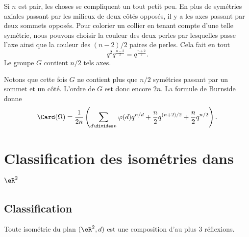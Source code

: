 Si \( n\) est pair, les choses se compliquent un tout petit peu. En plus de symétries axiales passant par les milieux de deux côtés opposés, il y a les axes passant par deux sommets opposés. Pour colorier un collier en tenant compte d'une telle symétrie, nous pouvons choisir la couleur des deux perles par lesquelles passe l'axe ainsi que la couleur des \( (n-2)/2\) paires de perles. Cela fait en tout
\begin{equation}
	q^2q^{\frac{ n-2 }{2}}=q^{\frac{ n+2 }{2}}.
\end{equation}
Le groupe \( G\) contient \( n/2\) tels axes.

Notons que cette fois \( G\) ne contient plus que \( n/2\) symétries passant par un sommet et un côté. L'ordre de \( G\) est donc encore \( 2n\). La formule de Burnside donne
\begin{equation}
	\Card(\Omega)=\frac{1}{ 2n }\left( \sum_{d\divides n}\varphi(d)q^{n/d}+\frac{ n }{2}q^{(n+2)/2}+\frac{ n }{2}q^{n/2} \right).
\end{equation}



\section{Classification des isométries dans \( \eR^2\)}

\subsection{Classification}

\begin{theorem}      \label{THOooRORQooTDWFdv}
	Toute isométrie du plan \( (\eR^2,d)\) est une composition d'au plus \( 3\) réflexions.
\end{theorem}

